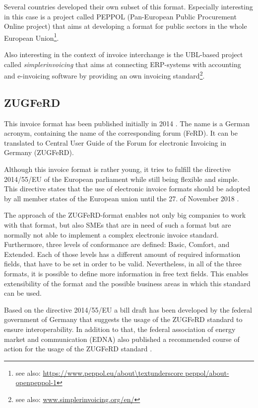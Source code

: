 Several countries developed their own subset of this format. Especially interesting in this case is a project called PEPPOL (Pan-European Public Procurement Online project) that aims at developing a format for public sectors in the whole European Union\footnote {see also: \url{https://www.peppol.eu/about\textunderscore peppol/about-openpeppol-1}}. 

Also interesting in the context of invoice interchange is the UBL-based project called \emph{simplerinvoicing} that aims at connecting ERP-systems with accounting and e-invoicing software by providing an own invoicing standard\footnote {see also: \url{www.simplerinvoicing.org/en/}}. 

\subsection{ZUGFeRD}
\label{sec2.1.4}

This invoice format has been published initially in 2014 \cite{Ferd14}. The name is a German acronym, containing the name of the corresponding forum (FeRD). It can be translated to Central User Guide of the Forum for electronic Invoicing in Germany (ZUGFeRD). 

Although this invoice format is rather young, it tries to fulfill the directive 2014/55/EU of the European parliament \cite{eu14} while still being flexible and simple. This directive states that the use of electronic invoice formats should be adopted by all member states of the European union until the 27. of November 2018 \cite[article 11]{eu14}. 
 
The approach of the ZUGFeRD-format enables not only big companies to work with that format, but also SMEs that are in need of such a format but are normally not able to implement a complex electronic invoice standard. 
Furthermore, three levels of conformance are defined: Basic, Comfort, and Extended. Each of those levels has a different amount of required information fields, that have to be set in order to be valid. Nevertheless, in all of the three formats, it is possible to define more information in free text fields. 
This enables extensibility of the format and the possible business areas in which this standard can be used.

Based on the directive 2014/55/EU \cite{eu14} a bill draft has been developed by the federal government of Germany \cite[page 10]{br16} that suggests the usage of the ZUGFeRD standard to ensure interoperability. In addition to that, the federal association of energy market and communication (EDNA) also published a recommended course of action for the usage of the ZUGFeRD standard \cite{edna16}.

